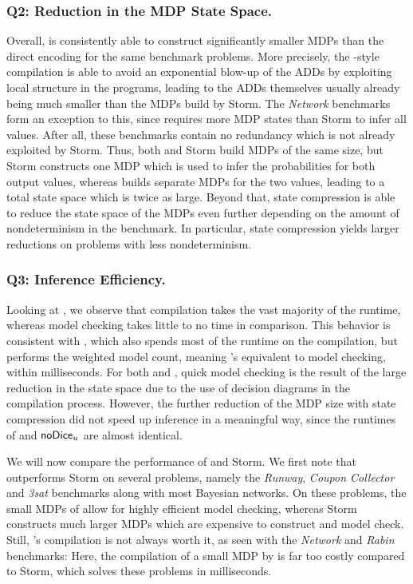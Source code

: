 \subsubsection*{Q2: Reduction in the MDP State Space.}
Overall, \NDICE is consistently able to construct significantly smaller MDPs than the direct encoding for the same benchmark problems.
More precisely, the \DICE-style compilation is able to avoid an exponential blow-up of the ADDs by exploiting local structure in the programs, leading to the ADDs themselves usually already being much smaller than the MDPs build by Storm.
The \textit{Network} benchmarks form an exception to this, since \NDICE requires more MDP states than Storm to infer all values.
After all, these benchmarks contain no redundancy which is not already exploited by Storm.
Thus, both \NDICE and Storm build MDPs of the same size, but Storm constructs one MDP which is used to infer the probabilities for both output values, whereas \NDICE builds separate MDPs for the two values, leading to a total state space which is twice as large.
Beyond that, state compression is able to reduce the state space of the MDPs even further depending on the amount of nondeterminism in the benchmark.
In particular, state compression yields larger reductions on problems with less nondeterminism.


\subsubsection*{Q3: Inference Efficiency.}
	Looking at \NDICE, we observe that compilation takes the vast majority of the runtime, whereas model checking takes little to no time in comparison.
	This behavior is consistent with \DICE, which also spends most of the runtime on the compilation, but performs the weighted model count, meaning \DICE's equivalent to model checking, within milliseconds.
	For both \NDICE and \DICE, quick model checking is the result of the large reduction in the state space due to the use of decision diagrams in the compilation process.
	However, the further reduction of the MDP size with state compression did not speed up \NDICE inference in a meaningful way, since the runtimes of \NDICE and $\textsf{\upshape {\mbox{noDice}}}_u$ are almost identical.
	
	We will now compare the performance of \NDICE and Storm.
	 We first note that \NDICE outperforms Storm on several problems, namely the \textit{Runway}, \textit{Coupon Collector} and \textit{3sat} benchmarks along with most Bayesian networks.
	On these problems, the small MDPs of \NDICE allow for highly efficient model checking, whereas Storm constructs much larger MDPs which are expensive to construct and model check.
	Still, \NDICE's compilation is not always worth it, as seen with the \textit{Network} and \textit{Rabin} benchmarks:
	Here, the compilation of a small MDP by \NDICE is far too costly compared to Storm, which solves these problems in milliseconds.
	
